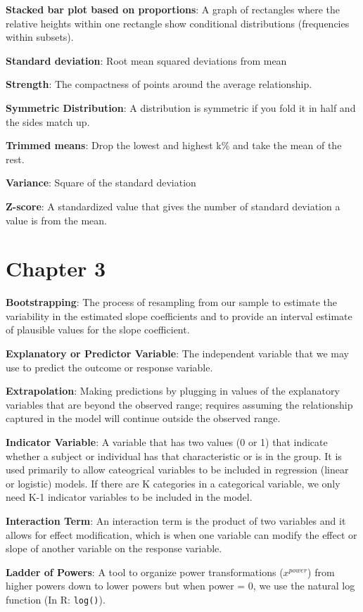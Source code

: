 \documentclass[
]{book}
\begin{document}
\textbf{Stacked bar plot based on proportions}: A graph of rectangles where the relative heights within one rectangle show conditional distributions (frequencies within subsets).

\textbf{Standard deviation}: Root mean squared deviations from mean

\textbf{Strength}: The compactness of points around the average relationship.

\textbf{Symmetric Distribution}: A distribution is symmetric if you fold it in half and the sides match up.

\textbf{Trimmed means}: Drop the lowest and highest k\% and take the mean of the rest.

\textbf{Variance}: Square of the standard deviation

\textbf{Z-score}: A standardized value that gives the number of standard deviation a value is from the mean.

\section{Chapter 3}\label{chapter-3}

\textbf{Bootstrapping}: The process of resampling from our sample to estimate the variability in the estimated slope coefficients and to provide an interval estimate of plausible values for the slope coefficient.

\textbf{Explanatory or Predictor Variable}: The independent variable that we may use to predict the outcome or response variable.

\textbf{Extrapolation}: Making predictions by plugging in values of the explanatory variables that are beyond the observed range; requires assuming the relationship captured in the model will continue outside the observed range.

\textbf{Indicator Variable}: A variable that has two values (0 or 1) that indicate whether a subject or individual has that characteristic or is in the group. It is used primarily to allow cateogrical variables to be included in regression (linear or logistic) models. If there are K categories in a categorical variable, we only need K-1 indicator variables to be included in the model.

\textbf{Interaction Term}: An interaction term is the product of two variables and it allows for effect modification, which is when one variable can modify the effect or slope of another variable on the response variable.

\textbf{Ladder of Powers}: A tool to organize power transformations (\(x^{power}\)) from higher powers down to lower powers but when power = 0, we use the natural log function (In R: \texttt{log()}).
\end{document}
